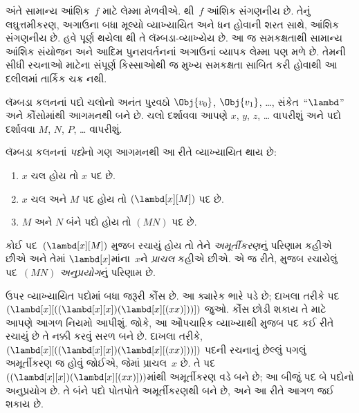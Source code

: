 અંતે સામાન્ય આંશિક~$f$ માટે લેમ્મા મેળવીએ.
થી~$f$ આંશિક સંગણનીય છે.
તેનું લઘુત્તમીકરણ, અગાઉના બધા મૂલ્યો વ્યાખ્યાયિત અને ધન હોવાની
શરત સાથે, આંશિક સંગણનીય છે. હવે પૂર્ણ થયેલા
થી તે લૅમ્બડા-વ્યાખ્યેય છે.
આ જ સમકક્ષતાથી સામાન્ય આંશિક સંયોજન અને આદિમ પુનરાવર્તનનાં
અગાઉનાં વ્યાપક લેમ્મા પણ મળે છે. તેમની સીધી રચનાઓ માટેના
સંપૂર્ણ કિસ્સાઓથી જ મુખ્ય સમકક્ષતા સાબિત કરી હોવાથી આ દલીલમાં
તાર્કિક ચક્ર નથી.
\endgroup


\OLEndChapterHook
\endgroup


\begingroup
\makeatletter{}\makeatother

\label{guunit:OLP-0356}


\begingroup
\makeatletter{}\makeatother

\label{guunit:OLP-0357}


લૅમ્બડા કલનનાં પદો ચલોનો અનંત પુરવઠો $\Obj{v_0}$, $\Obj{v_1}$,
\dots{}, સંકેત~``$\lambd$'' અને કૌંસોમાંથી આગમનથી બને છે. ચલો
દર્શાવવા આપણે $x$, $y$, $z$, \dots{} વાપરીશું અને પદો દર્શાવવા
$M$, $N$, $P$, \dots{} વાપરીશું.

\begin{defn}[પદો] 
લૅમ્બડા કલનનાં \emph{પદો}નો ગણ આગમનથી આ રીતે વ્યાખ્યાયિત થાય છે:
\begin{enumerate}
  \item {} $x$ ચલ હોય તો $x$ પદ છે.
  \item {} $x$ ચલ અને $M$ પદ હોય તો
    $(\lambd[x][M])$ પદ છે.
  \item {} $M$ અને $N$ બંને પદો હોય તો
    $(MN)$ પદ છે.
\end{enumerate}
\end{defn}

કોઈ પદ~$(\lambd[x][M])$  મુજબ રચાયું હોય
તો તેને \emph{અમૂર્તીકરણ}નું પરિણામ કહીએ છીએ અને તેમાં
$\lambd[x]$માંના~$x$ને \emph{પ્રાચલ} કહીએ છીએ. એ જ રીતે,
 મુજબ રચાયેલું પદ~$(MN)$
\emph{અનુપ્રયોગ}નું પરિણામ છે.

ઉપર વ્યાખ્યાયિત પદોમાં બધા જરૂરી કૌંસ છે. આ ક્યારેક ભારે પડે છે;
દાખલા તરીકે પદ
$(\lambd[x][((\lambd[x][x])(\lambd[x][(xx)]))])$ જુઓ. કૌંસ
છોડી શકાય તે માટે આપણે આગળ નિયમો આપીશું. જોકે, આ ઔપચારિક
વ્યાખ્યાથી  મુજબ પદ કઈ રીતે રચાયું છે તે નક્કી
કરવું સરળ બને છે. દાખલા તરીકે,
$(\lambd[x][((\lambd[x][x])(\lambd[x][(xx)]))])$ પદની રચનાનું
છેલ્લું પગલું અમૂર્તીકરણ જ હોવું જોઈએ, જેમાં પ્રાચલ~$x$ છે.
તે પદ~$((\lambd[x][x])(\lambd[x][(xx)]))$માંથી અમૂર્તીકરણ વડે
બને છે; આ બીજું પદ બે પદોનો અનુપ્રયોગ છે. તે બંને પદો પોતપોતે
અમૂર્તીકરણથી બને છે, અને આ રીતે આગળ જઈ શકાય છે.

